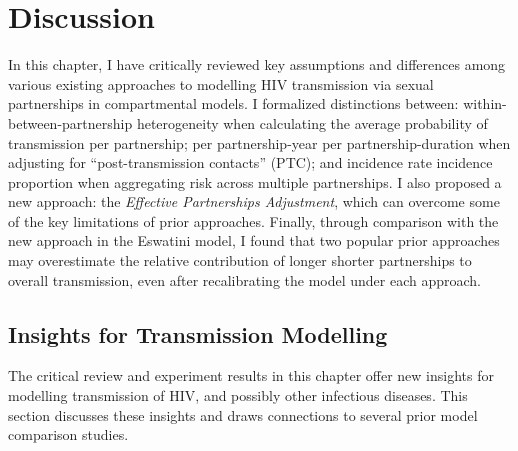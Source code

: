 \section{Discussion}\label{foi.disc}
In this chapter, I have critically reviewed
key assumptions and differences among various existing approaches to modelling
HIV transmission via sexual partnerships in compartmental models.
I formalized distinctions between:
within- \vs between-partnership heterogeneity
when calculating the average probability of transmission per partnership;
per partnership-year \vs per partnership-duration
when adjusting for ``post-transmission contacts'' (PTC); and
incidence rate \vs incidence proportion
when aggregating risk across multiple partnerships.
I also proposed a new approach: the \emph{Effective Partnerships Adjustment},
which can overcome some of the key limitations of prior approaches.
Finally, through comparison with the new approach in the Eswatini model,
I found that two popular prior approaches may overestimate
the relative contribution of longer \vs shorter partnerships to overall transmission,
even after recalibrating the model under each approach.
\subsection{Insights for Transmission Modelling}\label{foi.disc.ins}
The critical review and experiment results in this chapter
offer new insights for modelling transmission of HIV, and possibly other infectious diseases.
This section discusses these insights
and draws connections to several prior model comparison studies.
